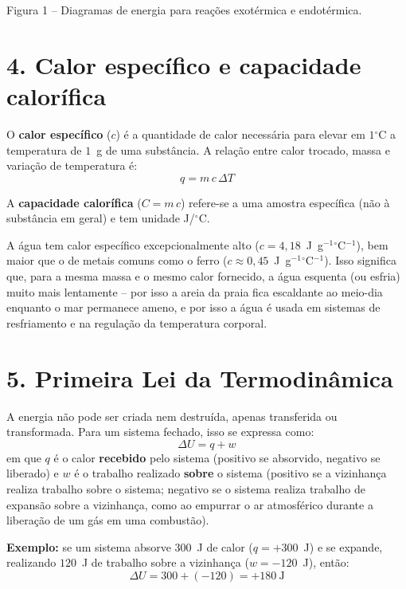 \documentclass[11pt,a4paper]{article}
\newcommand{\oC}{$^\circ$C}
\begin{document}
\begin{center}


{\small Figura 1 -- Diagramas de energia para reações exotérmica e
endotérmica.}
\end{center}

\section*{4. Calor específico e capacidade calorífica}

O \textbf{calor específico} ($c$) é a quantidade de calor necessária para
elevar em $1$\oC{} a temperatura de $1$~g de uma substância. A relação
entre calor trocado, massa e variação de temperatura é:
$$q = m \, c \, \Delta T$$

A \textbf{capacidade calorífica} ($C = m \, c$) refere-se a uma amostra
específica (não à substância em geral) e tem unidade J/\oC.

A água tem calor específico excepcionalmente alto
($c = 4{,}18$~J~g$^{-1}$\oC$^{-1}$), bem maior que o de metais comuns como
o ferro ($c \approx 0{,}45$~J~g$^{-1}$\oC$^{-1}$). Isso significa que, para
a mesma massa e o mesmo calor fornecido, a água esquenta (ou esfria) muito
mais lentamente -- por isso a areia da praia fica escaldante ao meio-dia
enquanto o mar permanece ameno, e por isso a água é usada em sistemas de
resfriamento e na regulação da temperatura corporal.

\section*{5. Primeira Lei da Termodinâmica}

A energia não pode ser criada nem destruída, apenas transferida ou
transformada. Para um sistema fechado, isso se expressa como:
$$\Delta U = q + w$$
em que $q$ é o calor \textbf{recebido} pelo sistema (positivo se
absorvido, negativo se liberado) e $w$ é o trabalho realizado
\textbf{sobre} o sistema (positivo se a vizinhança realiza trabalho sobre
o sistema; negativo se o sistema realiza trabalho de expansão sobre a
vizinhança, como ao empurrar o ar atmosférico durante a liberação de um
gás em uma combustão).

\textbf{Exemplo:} se um sistema absorve $300$~J de calor ($q = +300$~J) e
se expande, realizando $120$~J de trabalho sobre a vizinhança
($w = -120$~J), então:
$$\Delta U = 300 + (-120) = +180~\text{J}$$
\end{document}
